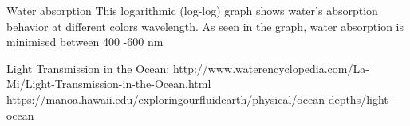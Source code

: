 Water absorption 
This logarithmic (log-log) graph shows water’s absorption behavior at different colors wavelength. As seen in the graph, water absorption is minimised between 400 -600 nm


Light Transmission in the Ocean: http://www.waterencyclopedia.com/La-Mi/Light-Transmission-in-the-Ocean.html
https://manoa.hawaii.edu/exploringourfluidearth/physical/ocean-depths/light-ocean

